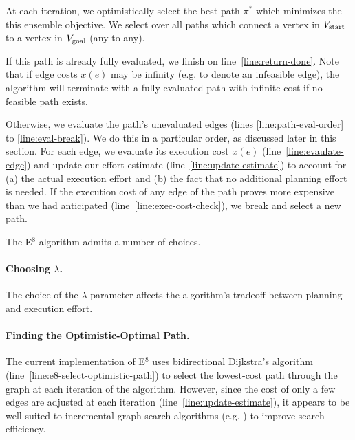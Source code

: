 At each iteration,
we optimistically select the best path $\pi^*$
which minimizes the this ensemble objective.
We select over all paths which connect
a vertex in $V_{\mbox{\scriptsize start}}$
to a vertex in $V_{\mbox{\scriptsize goal}}$
(any-to-any).

If this path is already fully evaluated,
we finish on line~\ref{line:return-done}.
Note that if edge costs $x(e)$ may be infinity
(e.g. to denote an infeasible edge),
the algorithm will terminate with a fully evaluated path
with infinite cost if no feasible path exists.

Otherwise,
we evaluate the path's unevaluated edges
(lines \ref{line:path-eval-order}
to \ref{line:eval-break}).
We do this in a particular order,
as discussed later in this section.
For each edge,
we evaluate its execution cost $x(e)$ (line~\ref{line:evaulate-edge})
and update our effort estimate (line~\ref{line:update-estimate})
to account for (a) the actual execution effort
and (b) the fact that no additional planning effort is needed.
If the execution cost of any edge of the path proves
more expensive than we had anticipated
(line~\ref{line:exec-cost-check}),
we break and select a new path.

The E$^8$ algorithm admits a number of choices.

\paragraph{Choosing $\lambda$.}
The choice of the $\lambda$ parameter
affects the algorithm's tradeoff between planning and execution effort.

\paragraph{Finding the Optimistic-Optimal Path.}
The current implementation of E$^8$ uses
bidirectional Dijkstra's algorithm
(line~\ref{line:e8-select-optimistic-path})
to select the lowest-cost path through the graph
at each iteration of the algorithm.
However, since the cost of only a few edges
are adjusted at each iteration (line~\ref{line:update-estimate}),
it appears to be well-suited to incremental
graph search algorithms (e.g. \citep{koenig2004lpastar})
to improve search efficiency.

